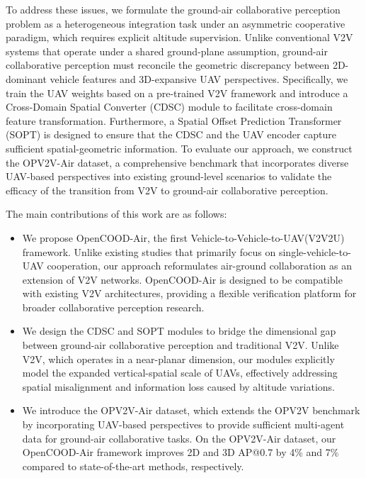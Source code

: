 \documentclass[conference]{IEEEtran}
\begin{document}
To address these issues, we formulate the ground-air collaborative perception problem as a heterogeneous integration task under an asymmetric cooperative paradigm, which requires explicit altitude supervision. Unlike conventional V2V systems that operate under a shared ground-plane assumption, ground-air collaborative perception must reconcile the geometric discrepancy between 2D-dominant vehicle features and 3D-expansive UAV perspectives. Specifically, we train the UAV weights based on a pre-trained V2V framework and introduce a Cross-Domain Spatial Converter (CDSC) module to facilitate cross-domain feature transformation. Furthermore, a Spatial Offset Prediction Transformer (SOPT) is designed to ensure that the CDSC and the UAV encoder capture sufficient spatial-geometric information. To evaluate our approach, we construct the OPV2V-Air dataset, a comprehensive benchmark that incorporates diverse UAV-based perspectives into existing ground-level scenarios to validate the efficacy of the transition from V2V to ground-air collaborative perception.

The main contributions of this work are as follows:
\begin{itemize}
    \item We propose OpenCOOD-Air, the first Vehicle-to-Vehicle-to-UAV(V2V2U) framework. Unlike existing studies that primarily focus on single-vehicle-to-UAV cooperation, our approach reformulates air-ground collaboration as an extension of V2V networks. OpenCOOD-Air is designed to be compatible with existing V2V architectures, providing a flexible verification platform for broader collaborative perception research.
    
    \item We design the CDSC and SOPT modules to bridge the dimensional gap between ground-air collaborative perception and traditional V2V. Unlike V2V, which operates in a near-planar dimension, our modules explicitly model the expanded vertical-spatial scale of UAVs, effectively addressing spatial misalignment and information loss caused by altitude variations.
    
    \item We introduce the OPV2V-Air dataset, which extends the OPV2V\cite{xu2022opv2v} benchmark by incorporating UAV-based perspectives to provide sufficient multi-agent data for ground-air collaborative tasks. On the OPV2V-Air dataset, our OpenCOOD-Air framework improves 2D and 3D AP@0.7 by 4\% and 7\% compared to state-of-the-art methods, respectively.
    
\end{itemize}
\end{document}
